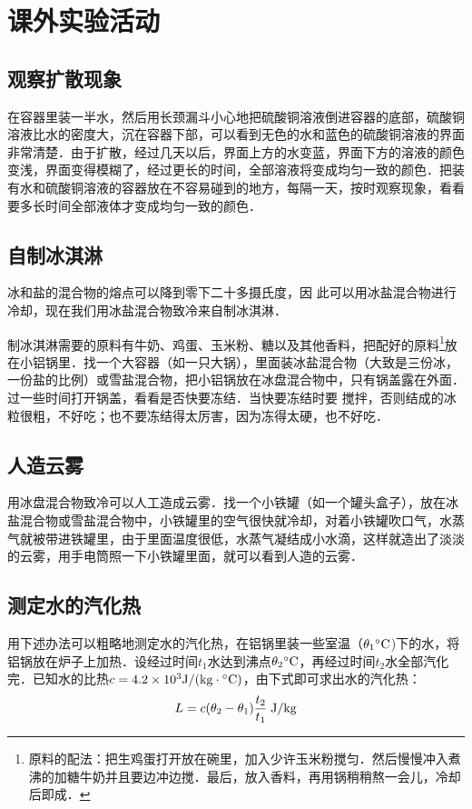 \chapter{课外实验活动}
\setcounter{section}{0}
\section{观察扩散现象}

在容器里装一半水，然后用长颈漏斗小心地把硫酸铜溶液倒进容器的底部，硫酸铜溶液比水的密度大，沉在容器下部，可以看到无色的水和蓝色的硫酸铜溶液的界面非常清楚．由于扩散，经过几天以后，界面上方的水变蓝，界面下方的溶液的颜色变浅，界面变得模糊了，经过更长的时间，全部溶液将变成均匀一致的颜色．把装有水和硫酸铜溶液的容器放在不容易碰到的地方，每隔一天，按时观察现象，看看要多长时间全部液体才变成均匀一致的颜色．

\section{自制冰淇淋}
冰和盐的混合物的熔点可以降到零下二十多摄氏度，因
此可以用冰盐混合物进行冷却，现在我们用冰盐混合物致冷来自制冰淇淋．

制冰淇淋需要的原料有牛奶、鸡蛋、玉米粉、糖以及其他香料，把配好的原料\footnote{原料的配法：把生鸡蛋打开放在碗里，加入少许玉米粉搅匀．然后慢慢冲入煮沸的加糖牛奶并且要边冲边搅．最后，放入香料，再用锅稍稍熬一会儿，冷却后即成．}放在小铝锅里．找一个大容器（如一只大锅），里面装冰盐混合物（大致是三份冰，一份盐的比例）或雪盐混合物，把小铝锅放在冰盘混合物中，只有锅盖露在外面．过一些时间打开锅盖，看看是否快要冻结．当快要冻结时要
搅拌，否则结成的冰粒很粗，不好吃；也不要冻结得太厉害，因为冻得太硬，也不好吃．

\section{人造云雾}
用冰盘混合物致冷可以人工造成云雾．找一个小铁罐（如一个罐头盒子），放在冰盐混合物或雪盐混合物中，小铁罐里的空气很快就冷却，对着小铁罐吹口气，水蒸气就被带进铁罐里，由于里面温度很低，水蒸气凝结成小水滴，这样就造出了淡淡的云雾，用手电筒照一下小铁罐里面，就可以看到人造的云雾．

\section{测定水的汽化热}
用下述办法可以粗略地测定水的汽化热，在铝锅里装一些室温（$\theta_1{}^\circ{\rm C}$)下的水，将铝锅放在炉子上加热．设经过时间$t_1$水达到沸点$\theta_2{}^\circ{\rm C}$，再经过时间$t_2$水全部汽化完．已知水的比热$c=4.2\times10^3{\rm J}/({\rm kg}\cdot {}^\circ{\rm C})$，由下式即可求出水的汽化热：
\[L=c(\theta_2-\theta_1)\frac{t_2}{t_1} \; {\rm J}/{\rm kg}  \]

